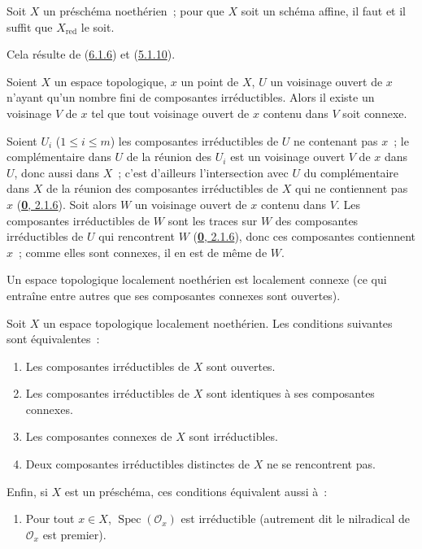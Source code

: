 \begin{corollary}[6.1.7]
\label{I.6.1.7-fr}
Soit $X$ un préschéma noethérien~; pour que $X$ soit un schéma affine, il faut
et il suffit que $X_{\mathrm{red}}$ le soit.
\end{corollary}

Cela résulte de (\hyperref[I.6.1.6-fr]{6.1.6}) et
(\hyperref[I.5.1.10-fr]{5.1.10}).

\begin{lemma}[6.1.8]
\label{I.6.1.8-fr}
Soient $X$ un espace topologique, $x$ un point de $X$, $U$ un voisinage ouvert
de $x$ n'ayant qu'un nombre fini de composantes irréductibles. Alors il existe
un voisinage $V$ de $x$ tel que tout voisinage ouvert de $x$ contenu dans $V$
soit connexe.
\end{lemma}

Soient $U_i$ ($1\leq i\leq m$) les composantes irréductibles de $U$ ne
contenant pas $x$~; le complémentaire dans $U$ de la réunion des $U_i$ est un
voisinage ouvert $V$ de $x$ dans $U$, donc aussi dans $X$~; c'est d'ailleurs
l'intersection avec $U$ du complémentaire dans $X$ de la réunion des composantes irréductibles de $X$
qui ne contiennent pas $x$ (\hyperref[0.2.1.6-fr]{\textbf{0}, 2.1.6}). Soit alors $W$
un voisinage ouvert de $x$ contenu dans $V$. Les composantes irréductibles de
$W$ sont les traces sur $W$ des composantes irréductibles de $U$ qui
rencontrent $W$ (\hyperref[0.2.1.6-fr]{\textbf{0}, 2.1.6}), donc ces composantes
contiennent $x$~; comme elles sont connexes, il en est de même de $W$.

\begin{corollary}[6.1.9]
\label{I.6.1.9-fr}
Un espace topologique localement noethérien est localement connexe (ce qui
entraîne entre autres que ses composantes connexes sont ouvertes).
\end{corollary}

\begin{proposition}[6.1.10]
\label{I.6.1.10-fr}
Soit $X$ un espace topologique localement noethérien. Les conditions suivantes
sont équivalentes~:
\begin{enumerate}
  \item[\textup{a)}] Les composantes irréductibles de $X$ sont ouvertes.
  \item[\textup{b)}] Les composantes irréductibles de $X$ sont identiques à ses
    composantes connexes.
  \item[\textup{c)}] Les composantes connexes de $X$ sont irréductibles.
  \item[\textup{d)}] Deux composantes irréductibles distinctes de $X$ ne se rencontrent
    pas.
\end{enumerate}

Enfin, si $X$ est un préschéma, ces conditions équivalent aussi à~:
\begin{enumerate}
  \item[\textup{e)}] Pour tout $x\in X$, $\operatorname{Spec}(\mathscr{O}_x)$ est
    irréductible (autrement dit le nilradical de $\mathscr{O}_x$ est premier).
\end{enumerate}
\end{proposition}

